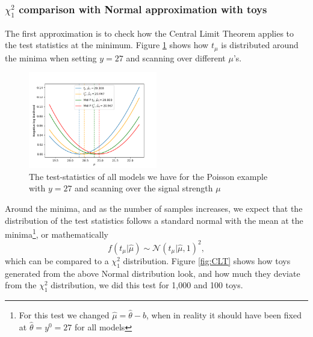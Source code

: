 \documentclass[14pt, a4paper]{article}  %
\begin{document}
\subsubsection{$\chi^2_1$ comparison with Normal approximation with toys}
The first approximation is to check how the Central Limit Theorem applies to the test statistics at the minimum. Figure \ref{fig:nlls} shows how $t_\mu$ is distributed around the minima when setting $y=27$ and scanning over different $\mu$'s. 
\begin{figure}[!ht]
	\centering
        \includegraphics[width=0.5\textwidth]{CLT/nll_book.png}
	\caption{The test-statistics of all models we have for the Poisson example with $y=27$ and scanning over the signal strength $\mu$}\label{fig:nlls}
\end{figure} 
Around the minima, and as the number of samples increases, we expect that the distribution of the test statistics follows a standard normal with the mean at the minima\footnote{For this test we changed $\hat\mu=\hat\theta-b$, when in reality it should have been fixed at $\hat{\theta} = y^0=27$ for all models}, or mathematically
$$
f(t_\mu|\hat{\mu}) \sim\mathcal{N}(t_\mu|\hat{\mu}, 1)^2,
$$
which can be compared to a $\chi^2_1$ distribution. Figure \ref{fig:CLT} shows how toys generated from the above Normal distribution look, and how much they deviate from the $\chi^2_1$ distribution, we did this test for 1,000 and 100 toys.
\end{document}
